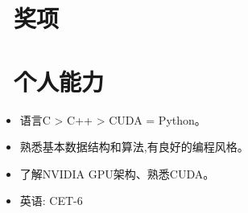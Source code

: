 \documentclass{resume}
\begin{document}
\vspace{-1ex}
\vspace{1.5ex}

\section{\faTrophy\ 奖项}
\vspace{0.5ex}
\vspace{0.5ex}

\vspace{-1ex}
\vspace{1.5ex}

\section{\faCogs\ 个人能力}
\begin{itemize}[parsep=0.5ex]
  \item 语言C > C++ > CUDA = Python。
  \item 熟悉基本数据结构和算法,有良好的编程风格。
  \item 了解NVIDIA GPU架构、熟悉CUDA。
  \item 英语: CET-6 
\end{itemize}


%
%
\end{document}
